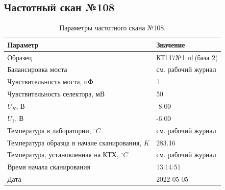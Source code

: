 \subsection{Частотный скан №108}
\begin{table}[!ht]
    \centering
    \caption{Параметры частотного скана №108.}
    \begin{tabular}{|l|l|}
        \hline
        Параметр                                       & Значение                  \\ \hline
        Образец                                        & КТ117№1 п1(база 2)        \\ \hline
        Балансировка моста                             & см. рабочий журнал        \\ \hline
        Чувствительность моста, пФ                     & 1                         \\ \hline
        Чувствительность селектора, мВ                 & 50                        \\ \hline
        $U_R$, В                                       & -8.00                     \\ \hline
        $U_1$, В                                       & -6.00                     \\ \hline
        Температура в лаборатории, $^\circ C$          & см. рабочий журнал        \\ \hline
        Температура образца в начале сканирования, $K$ & 283.16                    \\ \hline
        Температура, установленная на КТХ, $^\circ C$  & см. рабочий журнал        \\ \hline
        Время начала сканирования                      & 13:14:51                  \\ \hline
        Дата                                           & 2022-05-05                \\ \hline
    \end{tabular}
    \label{table:frequency_scan_108}
\end{table}

